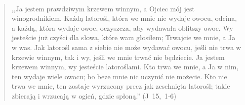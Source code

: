 \documentclass[10pt,a4paper,oneside]{article}
\begin{document}
\paragraph{}
\begin{quote}
,,Ja jestem prawdziwym krzewem winnym, a Ojciec mój jest winogrodnikiem. Każdą latorośl, która we mnie nie wydaje owocu, odcina, a każdą, która wydaje owoc, oczyszcza, aby wydawała obfitszy owoc. Wy jesteście już czyści dla słowa, które wam głosiłem; Trwajcie we mnie, a Ja w was. Jak latorośl sama z siebie nie może wydawać owocu, jeśli nie trwa w krzewie winnym, tak i wy, jeśli we mnie trwać nie będziecie. Ja jestem krzewem winnym, wy jesteście latoroślami. Kto trwa we mnie, a Ja w nim, ten wydaje wiele owocu; bo beze mnie nic uczynić nie możecie. Kto nie trwa we mnie, ten zostaje wyrzucony precz jak zeschnięta latorośl; takie zbierają i wrzucają w ogień, gdzie spłoną.'' \mbox{(J 15, 1-6)}
\end{quote}
\end{document}
